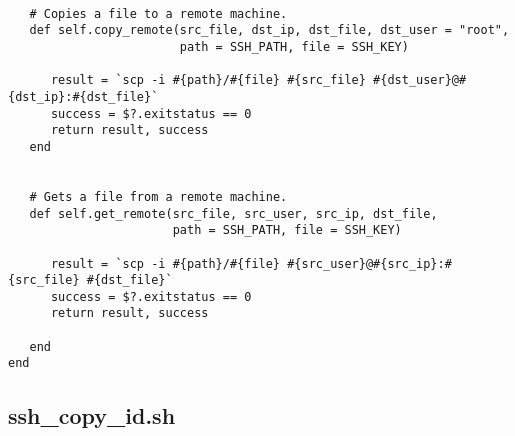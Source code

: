 \begin{lstlisting}
   
   # Copies a file to a remote machine.
   def self.copy_remote(src_file, dst_ip, dst_file, dst_user = "root",
                        path = SSH_PATH, file = SSH_KEY)
   
      result = `scp -i #{path}/#{file} #{src_file} #{dst_user}@#{dst_ip}:#{dst_file}`
      success = $?.exitstatus == 0
      return result, success
   end
   
   
   # Gets a file from a remote machine.
   def self.get_remote(src_file, src_user, src_ip, dst_file,
                       path = SSH_PATH, file = SSH_KEY)
   
      result = `scp -i #{path}/#{file} #{src_user}@#{src_ip}:#{src_file} #{dst_file}`
      success = $?.exitstatus == 0
      return result, success
   
   end
end
\end{lstlisting}


\subsection{ssh\_copy\_id.sh}


